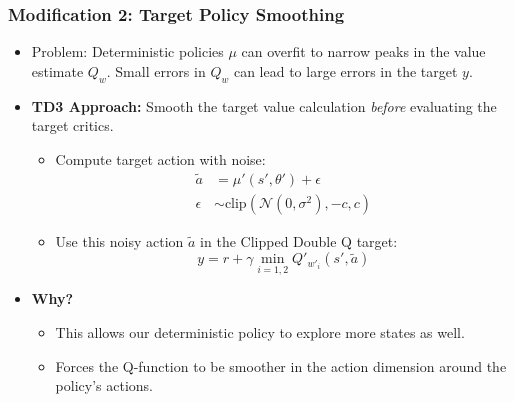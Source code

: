 \documentclass[9pt, aspectratio=169]{beamer}
\begin{document}
\begin{frame}
  \frametitle{Modification 2: Target Policy Smoothing}
    \begin{itemize}
        \item Problem: Deterministic policies $\mu$ can overfit to narrow peaks in the value estimate $Q_w$. Small errors in $Q_w$ can lead to large errors in the target $y$.

        \item \textbf{TD3 Approach:} Smooth the target value calculation \textit{before} evaluating the target critics.
        \begin{itemize}
            \item Compute target action with noise:
            \begin{align*}
            \tilde{a} &= \mu'(s', \theta') + \epsilon \\
            \epsilon &\sim \text{clip}(\mathcal{N}(0, \sigma^2), -c, c)
            \end{align*}
            \item Use this noisy action $\tilde{a}$ in the Clipped Double Q target:
             \begin{equation*}
            y = r + \gamma \min_{i=1,2} Q'_{w'_i}(s', \tilde{a})
            \end{equation*}
        \end{itemize}

        \item \textbf{Why?}
        \begin{itemize}
            \item This allows our deterministic policy to explore more states as well.
            \item Forces the Q-function to be smoother in the action dimension around the policy's actions.
        \end{itemize}
    \end{itemize}
\end{frame}
\end{document}
